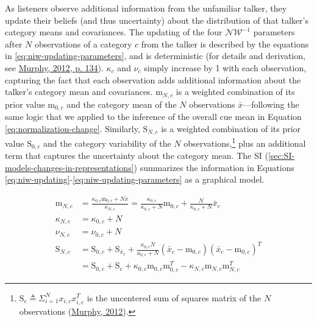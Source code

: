 \documentclass[
  11pt,
  man,floatsintext]{apa6}
\begin{document}
As listeners observe additional information from the unfamiliar talker, they update their beliefs (and thus uncertainty) about the distribution of that talker's category means and covariances. The updating of the four \(\mathcal{NW^{-1}}\) parameters after \(N\) observations of a category \(c\) from the talker is described by the equations in \eqref{eq:niw-updating-parameters}, and is deterministic (for details and derivation, see \protect\hyperlink{ref-murphy2012}{Murphy, 2012, p. 134}). \(\kappa_c\) and \(\nu_c\) simply increase by 1 with each observation, capturing the fact that each observation adds additional information about the talker's category mean and covariances. \(\mathrm{m}_{N,c}\) is a weighted combination of its prior value \(\mathrm{m}_{0,c}\) and the category mean of the \(N\) observations \(\bar{x}\)---following the same logic that we applied to the inference of the overall cue mean in Equation \eqref{eq:normalization-change}. Similarly, \(\mathrm{S}_{N,c}\) is a weighted combination of its prior value \(\mathrm{S}_{0,c}\) and the category variability of the \(N\) observations,\footnote{\(\mathrm{S}_c \triangleq \Sigma_{i=1}^N x_{i,c} x_{i,c}^T\) is the uncentered sum of squares matrix of the \(N\) observations (\protect\hyperlink{ref-murphy2012}{Murphy, 2012}).} plus an additional term that captures the uncertainty about the category mean. The SI (\ref{sec:SI-models-changes-in-representations}) summarizes the information in Equations \eqref{eq:niw-updating}-\eqref{eq:niw-updating-parameters} as a graphical model.

\begin{equation}\label{eq:niw-updating-parameters}
\begin{split}
\mathrm{m}_{N,c} & = \frac{\kappa_{0,c} \mathrm{m}_{0,c} + N \bar{x}}{\kappa_{N,c}} = \frac{\kappa_{0,c}}{\kappa_{0,c} + N} \mathrm{m}_{0,c} + \frac{N}{\kappa_{0,c} + N}\bar{x}_c \\
\kappa_{N,c} & = \kappa_{0,c} + N \\
\nu_{N,c} & = \nu_{0,c} + N \\
\mathrm{S}_{N,c} & = \mathrm{S}_{0,c} + \mathrm{S}_{\bar{x}_c} + \frac{\kappa_{0,c} N}{\kappa_{0,c} + N}\left( \bar{x}_c-\mathrm{m}_{0,c} \right) \left( \bar{x}_c-\mathrm{m}_{0,c} \right)^T \\
 & = \mathrm{S}_{0,c} + \mathrm{S}_c + \kappa_{0,c} \mathrm{m}_{0,c} \mathrm{m}_{0,c}^T - \kappa_{N,c} \mathrm{m}_{N,c} \mathrm{m}_{N,c}^T
\end{split}
\end{equation}
\end{document}
